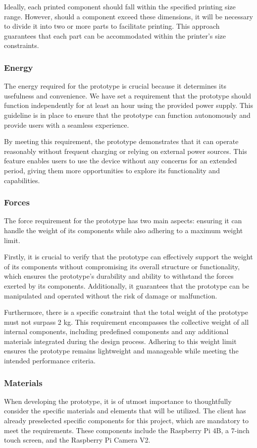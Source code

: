 Ideally, each printed component should fall within the specified printing size range. However, should a component exceed these dimensions, it will be necessary to divide it into two or more parts to facilitate printing. This approach guarantees that each part can be accommodated within the printer's size constraints.

\subsubsection{Energy}
The energy required for the prototype is crucial because it determines its usefulness and convenience. We have set a requirement that the prototype should function independently for at least an hour using the provided power supply. This guideline is in place to ensure that the prototype can function autonomously and provide users with a seamless experience.

By meeting this requirement, the prototype demonstrates that it can operate reasonably without frequent charging or relying on external power sources. This feature enables users to use the device without any concerns for an extended period, giving them more opportunities to explore its functionality and capabilities.

\subsubsection{Forces}
The force requirement for the prototype has two main aspects: ensuring it can handle the weight of its components while also adhering to a maximum weight limit.

Firstly, it is crucial to verify that the prototype can effectively support the weight of its components without compromising its overall structure or functionality, which ensures the prototype's durability and ability to withstand the forces exerted by its components. Additionally, it guarantees that the prototype can be manipulated and operated without the risk of damage or malfunction.

Furthermore, there is a specific constraint that the total weight of the prototype must not surpass 2 kg. This requirement encompasses the collective weight of all internal components, including predefined components and any additional materials integrated during the design process. Adhering to this weight limit ensures the prototype remains lightweight and manageable while meeting the intended performance criteria.

\subsubsection{Materials}
When developing the prototype, it is of utmost importance to thoughtfully consider the specific materials and elements that will be utilized. The client has already preselected specific components for this project, which are mandatory to meet the requirements. These components include the Raspberry Pi 4B, a 7-inch touch screen, and the Raspberry Pi Camera V2.

